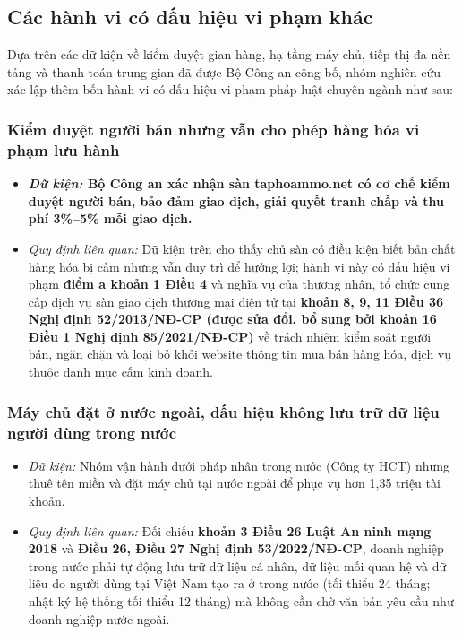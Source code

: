\subsection{Các hành vi có dấu hiệu vi phạm khác}\label{sec:3.2}

Dựa trên các dữ kiện về kiểm duyệt gian hàng, hạ tầng máy chủ, tiếp thị đa nền tảng và thanh toán trung gian đã được Bộ Công an công bố, nhóm nghiên cứu xác lập thêm bốn hành vi có dấu hiệu vi phạm pháp luật chuyên ngành như sau:

\subsubsection{Kiểm duyệt người bán nhưng vẫn cho phép hàng hóa vi phạm lưu hành}\label{sec:3.2.1}

\begin{itemize}
\item \textbf{\textit{Dữ kiện:} Bộ Công an xác nhận sàn taphoammo.net có cơ chế kiểm duyệt người bán, bảo đảm giao dịch, giải quyết tranh chấp và thu phí 3\%–5\% mỗi giao dịch.}
\item \textit{Quy định liên quan:} Dữ kiện trên cho thấy chủ sàn có điều kiện biết bản chất hàng hóa bị cấm nhưng vẫn duy trì để hưởng lợi; hành vi này có dấu hiệu vi phạm \textbf{điểm a khoản 1 Điều 4} và nghĩa vụ của thương nhân, tổ chức cung cấp dịch vụ sàn giao dịch thương mại điện tử tại \textbf{khoản 8, 9, 11 Điều 36 Nghị định 52/2013/NĐ-CP (được sửa đổi, bổ sung bởi khoản 16 Điều 1 Nghị định 85/2021/NĐ-CP)} về trách nhiệm kiểm soát người bán, ngăn chặn và loại bỏ khỏi website thông tin mua bán hàng hóa, dịch vụ thuộc danh mục cấm kinh doanh.
\end{itemize}
\subsubsection{Máy chủ đặt ở nước ngoài, dấu hiệu không lưu trữ dữ liệu người dùng trong nước}\label{sec:3.2.2}

\begin{itemize}
\item \textit{Dữ kiện:} Nhóm vận hành dưới pháp nhân trong nước (Công ty HCT) nhưng thuê tên miền và đặt máy chủ tại nước ngoài để phục vụ hơn 1,35 triệu tài khoản.
\item \textit{Quy định liên quan:} Đối chiếu \textbf{khoản 3 Điều 26 Luật An ninh mạng 2018} và \textbf{Điều 26, Điều 27 Nghị định 53/2022/NĐ-CP}, doanh nghiệp trong nước phải tự động lưu trữ dữ liệu cá nhân, dữ liệu mối quan hệ và dữ liệu do người dùng tại Việt Nam tạo ra ở trong nước (tối thiểu 24 tháng; nhật ký hệ thống tối thiểu 12 tháng) mà không cần chờ văn bản yêu cầu như doanh nghiệp nước ngoài.
\end{itemize}
